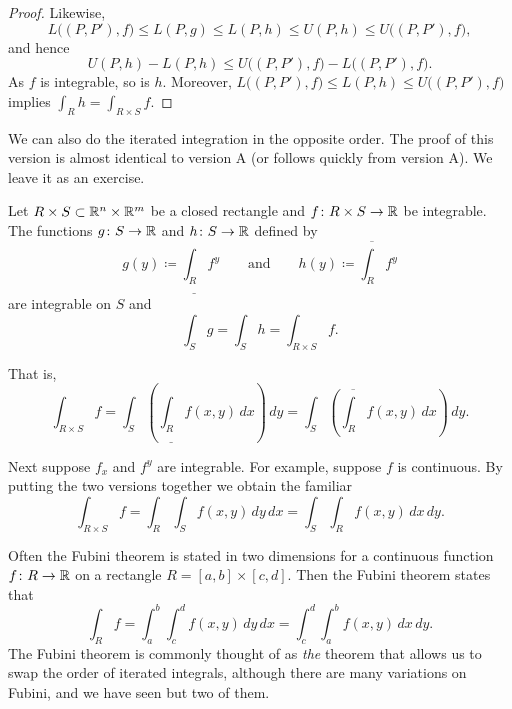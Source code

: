 \begin{proof}
Likewise,
\begin{equation*}
L\bigl((P,P'),f\bigr)
\leq
L(P,g) \leq
L(P,h) \leq
U(P,h) \leq
U\bigl((P,P'),f\bigr) ,
\end{equation*}
and hence
\begin{equation*}
U(P,h) - L(P,h)
\leq
U\bigl((P,P'),f\bigr) -
L\bigl((P,P'),f\bigr) .
\end{equation*}
As $f$ is integrable, so is $h$.
Moreover, $L\bigl((P,P'),f\bigr) \leq L(P,h) \leq U\bigl((P,P'),f\bigr)$
implies
$\int_R h = \int_{R \times S} f$.
\end{proof}

We can also do the iterated integration in the opposite order.
The proof of this version is almost identical to version A
(or follows quickly from version A)\@.
We leave it as an exercise.

\begin{thm}\label{mv:fubinivB}
\pagebreak[2]
Let $R \times S \subset {\mathbb{R}}^n \times {\mathbb{R}}^m$ be a closed rectangle and
$f \colon R \times S \to {\mathbb{R}}$ be integrable.
The functions $g \colon S \to {\mathbb{R}}$ and $h \colon S \to {\mathbb{R}}$ defined by
\begin{equation*}
g(y) \coloneqq \underline{\int_R} f^y \qquad
\text{and} \qquad
h(y) \coloneqq \overline{\int_R} f^y 
\end{equation*}
are integrable on $S$ and
\begin{equation*}
\int_S g = \int_S h = \int_{R \times S} f .
\end{equation*}
\end{thm}

That is,
\begin{equation*}
\int_{R \times S} f
=
 \int_S \left(
 \underline{\int_R} f(x,y) \, dx
\right) \, dy
=
 \int_S \left(
 \overline{\int_R} f(x,y) \, dx
\right) \, dy .
\end{equation*}

Next suppose $f_x$ and $f^y$ are integrable.
For example, suppose $f$ is continuous.  By
putting the two versions together we obtain the familiar
\begin{equation*}
\int_{R \times S} f
=
 \int_R 
 \int_S f(x,y) \, dy \, dx 
=
 \int_S 
 \int_R f(x,y) \, dx \, dy .
\end{equation*}

Often the Fubini theorem is stated in two dimensions
for a continuous function $f \colon R \to
{\mathbb{R}}$ on a rectangle $R = [a,b] \times [c,d]$.  Then the Fubini theorem
states that
\begin{equation*}
\int_R f = \int_a^b \int_c^d f(x,y) \,dy\,dx
=
\int_c^d \int_a^b f(x,y) \,dx\,dy .
\end{equation*}
The Fubini theorem is commonly thought of as \emph{the} theorem that allows us
to swap the order of iterated integrals, although there are many variations
on Fubini, and we have seen but two of them.

